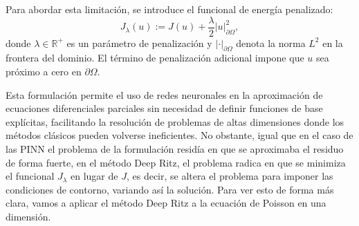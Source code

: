 \documentclass[a4paper,11pt,spanish, twoside, leqno]{tfg-uam}
\theoremstyle{definition}
\begin{document}
Para abordar esta limitación, se introduce el funcional de energía penalizado:
\begin{equation*}
J_{\lambda}(u) := J(u) + \frac{\lambda}{2} |u|^2_{\partial \Omega},
\end{equation*}
donde $ \lambda \in \mathbb{R}^+ $ es un parámetro de penalización y $ | \cdot |_{\partial \Omega} $ denota la norma $ L^2 $ en la frontera del dominio. El término de penalización adicional impone que $ u $ sea próximo a cero en $ \partial \Omega $.

Esta formulación permite el uso de redes neuronales en la aproximación de ecuaciones diferenciales parciales sin necesidad de definir funciones de base explícitas, facilitando la resolución de problemas de altas dimensiones donde los métodos clásicos pueden volverse ineficientes. No obstante, igual que en el caso de las PINN el problema de la formulación residía en que se aproximaba el residuo de forma fuerte, en el método Deep Ritz, el problema radica en que se minimiza el funcional $ J_{\lambda} $ en lugar de $ J $, es decir, se altera el problema para imponer las condiciones de contorno, variando así la solución. Para ver esto de forma más clara, vamos a aplicar el método Deep Ritz a la ecuación de Poisson en una dimensión.
\end{document}
